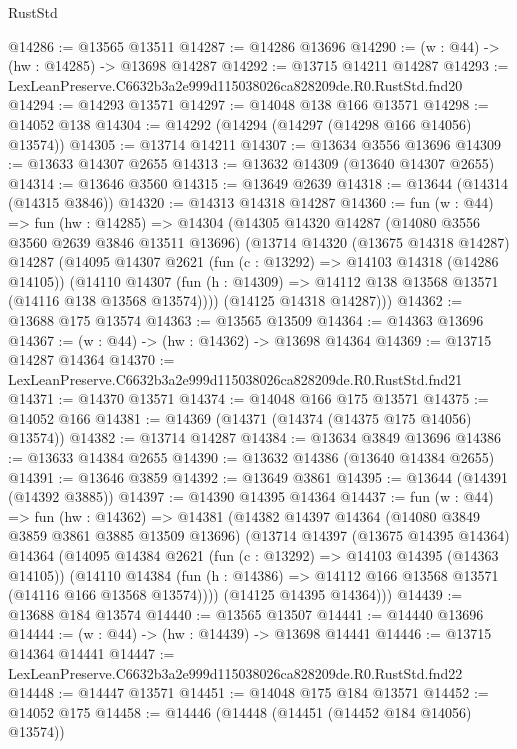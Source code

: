 \begin{lexlean}{RustStd}
\begin{coremodule}
@14286 := @13565 @13511
@14287 := @14286 @13696
@14290 := (w : @44) -> (hw : @14285) -> @13698 @14287
@14292 := @13715 @14211 @14287
@14293 := LexLeanPreserve.C6632b3a2e999d115038026ca828209de.R0.RustStd.fnd20
@14294 := @14293 @13571
@14297 := @14048 @138 @166 @13571
@14298 := @14052 @138
@14304 := @14292 (@14294 (@14297 (@14298 @166 @14056) @13574))
@14305 := @13714 @14211
@14307 := @13634 @3556 @13696
@14309 := @13633 @14307 @2655
@14313 := @13632 @14309 (@13640 @14307 @2655)
@14314 := @13646 @3560
@14315 := @13649 @2639
@14318 := @13644 (@14314 (@14315 @3846))
@14320 := @14313 @14318 @14287
@14360 := fun (w : @44) =>
  fun (hw : @14285) =>
  @14304
    (@14305
      @14320
      @14287
      (@14080 @3556 @3560 @2639 @3846 @13511 @13696)
      (@13714
        @14320
        (@13675 @14318 @14287)
        @14287
        (@14095
          @14307
          @2621
          (fun (c : @13292) => @14103 @14318 (@14286 @14105))
          (@14110
            @14307
            (fun (h : @14309) => @14112 @138 @13568 @13571 (@14116 @138 @13568 @13574))))
        (@14125 @14318 @14287)))
@14362 := @13688 @175 @13574
@14363 := @13565 @13509
@14364 := @14363 @13696
@14367 := (w : @44) -> (hw : @14362) -> @13698 @14364
@14369 := @13715 @14287 @14364
@14370 := LexLeanPreserve.C6632b3a2e999d115038026ca828209de.R0.RustStd.fnd21
@14371 := @14370 @13571
@14374 := @14048 @166 @175 @13571
@14375 := @14052 @166
@14381 := @14369 (@14371 (@14374 (@14375 @175 @14056) @13574))
@14382 := @13714 @14287
@14384 := @13634 @3849 @13696
@14386 := @13633 @14384 @2655
@14390 := @13632 @14386 (@13640 @14384 @2655)
@14391 := @13646 @3859
@14392 := @13649 @3861
@14395 := @13644 (@14391 (@14392 @3885))
@14397 := @14390 @14395 @14364
@14437 := fun (w : @44) =>
  fun (hw : @14362) =>
  @14381
    (@14382
      @14397
      @14364
      (@14080 @3849 @3859 @3861 @3885 @13509 @13696)
      (@13714
        @14397
        (@13675 @14395 @14364)
        @14364
        (@14095
          @14384
          @2621
          (fun (c : @13292) => @14103 @14395 (@14363 @14105))
          (@14110
            @14384
            (fun (h : @14386) => @14112 @166 @13568 @13571 (@14116 @166 @13568 @13574))))
        (@14125 @14395 @14364)))
@14439 := @13688 @184 @13574
@14440 := @13565 @13507
@14441 := @14440 @13696
@14444 := (w : @44) -> (hw : @14439) -> @13698 @14441
@14446 := @13715 @14364 @14441
@14447 := LexLeanPreserve.C6632b3a2e999d115038026ca828209de.R0.RustStd.fnd22
@14448 := @14447 @13571
@14451 := @14048 @175 @184 @13571
@14452 := @14052 @175
@14458 := @14446 (@14448 (@14451 (@14452 @184 @14056) @13574))

\end{coremodule}
\end{lexlean}
